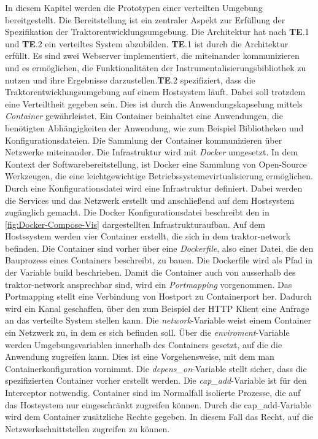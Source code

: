 In diesem Kapitel werden die Prototypen einer verteilten Umgebung bereitgestellt. Die Bereitstellung ist ein zentraler Aspekt zur Erfüllung der Spezifikation der Traktorentwicklungsumgebung. Die Architektur hat nach \textbf{TE}.1 und \textbf{TE}.2 ein verteiltes System abzubilden. \textbf{TE}.1 ist durch die Architektur erfüllt. Es sind zwei Webserver implementiert, die miteinander kommunizieren und es ermöglichen, die Funktionalitäten der Instrumentalisierungsbibliothek zu nutzen und ihre Ergebnisse darzustellen.\textbf{TE}.2 spezifiziert, dass die Traktorentwicklungsumgebung auf einem Hostsystem läuft. Dabei soll trotzdem eine Verteiltheit gegeben sein. Dies ist durch die Anwendungskapselung mittels \emph{Container} gewährleistet. Ein Container beinhaltet eine Anwendungen, die benötigten Abhängigkeiten der Anwendung, wie zum Beispiel Bibliotheken und Konfigurationsdateien. Die Sammlung der Container kommunizieren über Netzwerke miteinander. Die Infrastruktur wird mit \emph{Docker} umgesetzt. In dem Kontext der Softwarebereitstellung, ist Docker eine Sammlung von Open-Source Werkzeugen, die eine leichtgewichtige Betriebssystemevirtualisierung ermöglichen. Durch eine Konfigurationsdatei wird eine Infrastruktur definiert. Dabei werden die Services und das Netzwerk erstellt und anschließend auf dem Hostsystem zugänglich gemacht. Die Docker Konfigurationsdatei beschreibt den in \cref{fig:Docker-Compose-Vis} dargestellten Infrastrukturaufbau. Auf dem Hostssystem werden vier Container erstellt, die sich in dem traktor-network befinden. Die Container sind vorher über eine \emph{Dockerfile}, also einer Datei, die den Bauprozess eines Containers beschreibt, zu bauen. Die Dockerfile wird als Pfad in der Variable build beschrieben. Damit die Container auch von ausserhalb des traktor-network ansprechbar sind, wird ein \emph{Portmapping} vorgenommen. Das Portmapping stellt eine Verbindung von Hostport zu Containerport her. Dadurch wird ein Kanal geschaffen, über den zum Beispiel der HTTP Klient eine Anfrage an das verteilte System stellen kann. Die \emph{network}-Variable weist einem Container ein Netzwerk zu, in dem es sich befinden soll. Über die \emph{enviroment}-Variable werden Umgebungsvariablen innerhalb des Containers gesetzt, auf die die Anwendung zugreifen kann. Dies ist eine Vorgehensweise, mit dem man Containerkonfiguration vornimmt. Die \emph{depens\_on}-Variable stellt sicher, dass die spezifizierten Container vorher erstellt werden. Die \emph{cap\_add}-Variable ist für den Interceptor notwendig. Container sind im Normalfall isolierte Prozesse, die auf das Hostsystem nur eingeschränkt zugreifen können. Durch die cap\_add-Variable wird dem Container zusätzliche Rechte gegeben. In diesem Fall das Recht, auf die Netzwerkschnittstellen zugreifen zu können.
